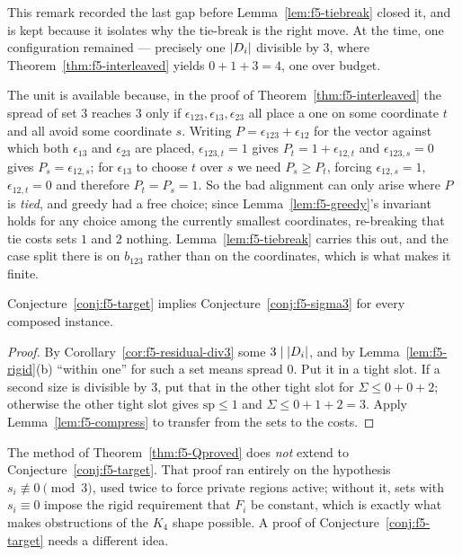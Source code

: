 \begin{remark}[Superseded]
\label{rem:f5-lastgap}
This remark recorded the last gap before
Lemma~\ref{lem:f5-tiebreak} closed it, and is kept because it isolates why the
tie-break is the right move. At the time, one configuration remained --- precisely
one $\left\lvert D_i\right\rvert$ divisible by $3$, where
Theorem~\ref{thm:f5-interleaved} yields $0 + 1 + 3 = 4$, one over budget.

The unit is available because, in the proof of
Theorem~\ref{thm:f5-interleaved} the spread of set $3$ reaches $3$ only if
$\epsilon_{123}, \epsilon_{13}, \epsilon_{23}$ all place a one on some coordinate
$t$ and all avoid some coordinate $s$. Writing
$P = \epsilon_{123}+\epsilon_{12}$ for the vector against which both
$\epsilon_{13}$ and $\epsilon_{23}$ are placed, $\epsilon_{123,t}=1$ gives
$P_t = 1 + \epsilon_{12,t}$ and $\epsilon_{123,s}=0$ gives
$P_s = \epsilon_{12,s}$; for $\epsilon_{13}$ to choose $t$ over $s$ we need
$P_s \ge P_t$, forcing $\epsilon_{12,s}=1$, $\epsilon_{12,t}=0$ and therefore
$P_t = P_s = 1$. So the bad alignment can only arise where $P$ is \emph{tied},
and greedy had a free choice; since Lemma~\ref{lem:f5-greedy}'s invariant holds
for any choice among the currently smallest coordinates, re-breaking that tie
costs sets $1$ and $2$ nothing. Lemma~\ref{lem:f5-tiebreak} carries this out,
and the case split there is on $b_{123}$ rather than on the coordinates, which
is what makes it finite.
\end{remark}

\begin{proposition}
\label{prop:f5-target-suffices}
Conjecture~\ref{conj:f5-target} implies Conjecture~\ref{conj:f5-sigma3} for every
composed instance.
\end{proposition}

\begin{proof}
By Corollary~\ref{cor:f5-residual-div3} some $3 \mid \left\lvert D_i\right\rvert$, and by
Lemma~\ref{lem:f5-rigid}(b) ``within one'' for such a set means spread $0$. Put
it in a tight slot. If a second size is divisible by $3$, put that in the other
tight slot for $\Sigma \le 0 + 0 + 2$; otherwise the other tight slot gives
$\mathrm{sp} \le 1$ and $\Sigma \le 0 + 1 + 2 = 3$. Apply
Lemma~\ref{lem:f5-compress} to transfer from the sets to the costs.
\end{proof}

The method of Theorem~\ref{thm:f5-Qproved} does \emph{not} extend to
Conjecture~\ref{conj:f5-target}. That proof ran entirely on the hypothesis
$s_i \not\equiv 0 \pmod 3$, used twice to force private regions active; without
it, sets with $s_i \equiv 0$ impose the rigid requirement that $F_i$ be constant,
which is exactly what makes obstructions of the $K_4$ shape possible. A proof of
Conjecture~\ref{conj:f5-target} needs a different idea.


